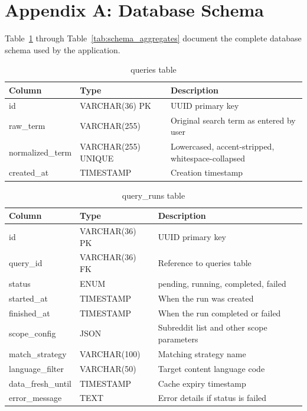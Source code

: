 \pagestyle{fancy}
\fancyhf{}
\renewcommand{\headrulewidth}{0.4pt}

\section*{Appendix A: Database Schema}

Table~\ref{tab:schema_queries} through Table~\ref{tab:schema_aggregates} document the complete database schema used by the application.

\begin{table}[H]
\centering
\caption{queries table}
\label{tab:schema_queries}
\small
\begin{tabularx}{\textwidth}{ll>{\raggedright\arraybackslash}X}
\toprule
\textbf{Column} & \textbf{Type} & \textbf{Description} \\
\midrule
id & VARCHAR(36) PK & UUID primary key \\
raw\_term & VARCHAR(255) & Original search term as entered by user \\
normalized\_term & VARCHAR(255) UNIQUE & Lowercased, accent-stripped, whitespace-collapsed \\
created\_at & TIMESTAMP & Creation timestamp \\
\bottomrule
\end{tabularx}
\end{table}

\begin{table}[H]
\centering
\caption{query\_runs table}
\label{tab:schema_query_runs}
\small
\begin{tabularx}{\textwidth}{ll>{\raggedright\arraybackslash}X}
\toprule
\textbf{Column} & \textbf{Type} & \textbf{Description} \\
\midrule
id & VARCHAR(36) PK & UUID primary key \\
query\_id & VARCHAR(36) FK & Reference to queries table \\
status & ENUM & pending, running, completed, failed \\
started\_at & TIMESTAMP & When the run was created \\
finished\_at & TIMESTAMP & When the run completed or failed \\
scope\_config & JSON & Subreddit list and other scope parameters \\
match\_strategy & VARCHAR(100) & Matching strategy name \\
language\_filter & VARCHAR(50) & Target content language code \\
data\_fresh\_until & TIMESTAMP & Cache expiry timestamp \\
error\_message & TEXT & Error details if status is failed \\
\bottomrule
\end{tabularx}
\end{table}


